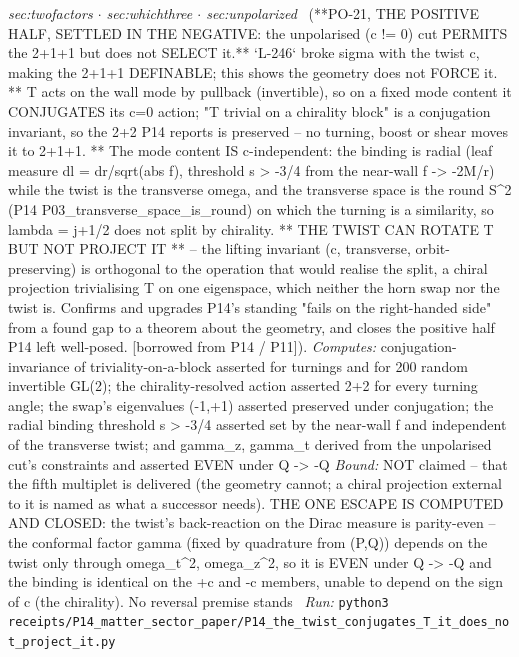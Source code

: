 \begin{description}
\textit{sec:twofactors \ensuremath{\cdot} sec:whichthree \ensuremath{\cdot} sec:unpolarized} \ (**PO-21, THE POSITIVE HALF, SETTLED IN THE NEGATIVE: the unpolarised (c != 0) cut PERMITS the 2+1+1 but does not SELECT it.** `L-246` broke sigma with the twist c, making the 2+1+1 DEFINABLE; this shows the geometry does not FORCE it. ** T acts on the wall mode by pullback (invertible), so on a fixed mode content it CONJUGATES its c=0 action; "T trivial on a chirality block" is a conjugation invariant, so the 2+2 P14 reports is preserved -- no turning, boost or shear moves it to 2+1+1. ** The mode content IS c-independent: the binding is radial (leaf measure dl = dr/sqrt(abs f), threshold s > -3/4 from the near-wall f -> -2M/r) while the twist is the transverse omega, and the transverse space is the round S\textasciicircum{}2 (P14 P03\_transverse\_space\_is\_round) on which the turning is a similarity, so lambda = j+1/2 does not split by chirality. ** THE TWIST CAN ROTATE T BUT NOT PROJECT IT ** -- the lifting invariant (c, transverse, orbit-preserving) is orthogonal to the operation that would realise the split, a chiral projection trivialising T on one eigenspace, which neither the horn swap nor the twist is. Confirms and upgrades P14's standing "fails on the right-handed side" from a found gap to a theorem about the geometry, and closes the positive half P14 left well-posed. [borrowed from P14 / P11]). 
\emph{Computes:} conjugation-invariance of triviality-on-a-block asserted for turnings and for 200 random invertible GL(2); the chirality-resolved action asserted 2+2 for every turning angle; the swap's eigenvalues (-1,+1) asserted preserved under conjugation; the radial binding threshold s > -3/4 asserted set by the near-wall f and independent of the transverse twist; and gamma\_z, gamma\_t derived from the unpolarised cut's constraints and asserted EVEN under Q -> -Q
 \emph{Bound:} NOT claimed -- that the fifth multiplet is delivered (the geometry cannot; a chiral projection external to it is named as what a successor needs). THE ONE ESCAPE IS COMPUTED AND CLOSED: the twist's back-reaction on the Dirac measure is parity-even -- the conformal factor gamma (fixed by quadrature from (P,Q)) depends on the twist only through omega\_t\textasciicircum{}2, omega\_z\textasciicircum{}2, so it is EVEN under Q -> -Q and the binding is identical on the +c and -c members, unable to depend on the sign of c (the chirality). No reversal premise stands
\ \emph{Run:} \texttt{python3 receipts/P14\_matter\_sector\_paper/P14\_the\_twist\_conjugates\_T\_it\_does\_not\_project\_it.py}

\end{description}

